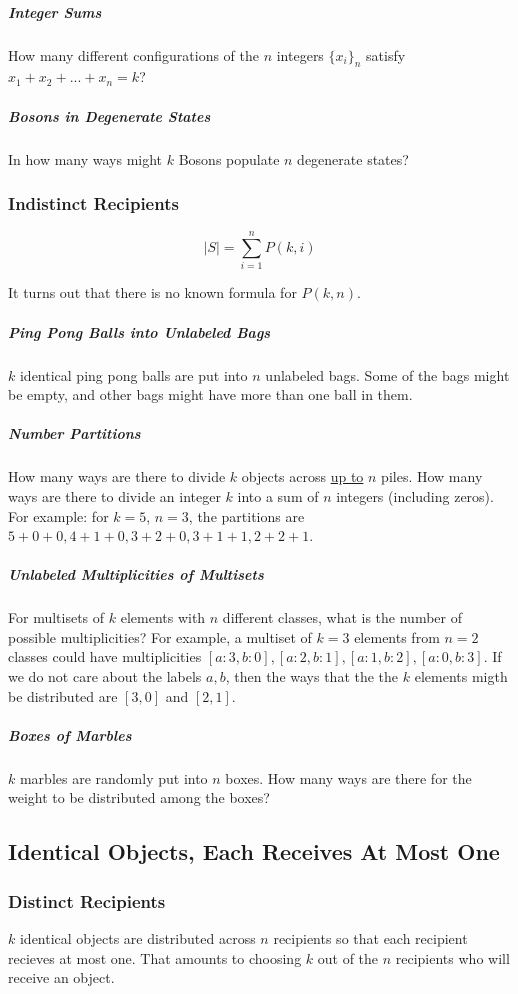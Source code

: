 \subparagraph{Integer Sums} How many different configurations of the $n$ integers $\{ x_i\}_n$ satisfy $x_1 + x_2 + ... + x_n = k$?

\subparagraph{Bosons in Degenerate States} In how many ways might $k$ Bosons populate $n$ degenerate states?

\subsubsection{Indistinct Recipients}

\begin{equation}
|S| = \sum_{i=1}^n P(k,i)
\end{equation}

It turns out that there is no known formula for $P(k,n)$.

\subparagraph{Ping Pong Balls into Unlabeled Bags} $k$ identical ping pong balls are put into $n$ unlabeled bags. Some of the bags might be empty, and other bags might have more than one ball in them.

\subparagraph{Number Partitions} How many ways are there to divide $k$ objects across \underline{up to} $n$ piles. How many ways are there to divide an integer $k$ into a sum of $n$ integers (including zeros). For example: for $k=5$, $n=3$, the partitions are $5+0+0, 4+1+0, 3+2+0, 3+1+1, 2+2+1$.

\subparagraph{Unlabeled Multiplicities of Multisets} For multisets of $k$ elements with $n$ different classes, what is the number of possible multiplicities? For example, a multiset of $k=3$ elements from $n=2$ classes could have multiplicities $[a:3,b:0], [a:2,b:1],[a:1,b:2],[a:0,b:3]$. If we do not care about the labels $a,b$, then the ways that the the $k$ elements migth be distributed are $[3,0]$ and $[2,1]$.

\subparagraph{Boxes of Marbles} $k$ marbles are randomly put into $n$ boxes. How many ways are there for the weight to be distributed among the boxes?



\subsection{Identical Objects, Each Receives At Most One}

\subsubsection{Distinct Recipients}
$k$ identical objects are distributed across $n$ recipients so that each recipient recieves at most one. That amounts to choosing $k$ out of the $n$ recipients who will receive an object.

